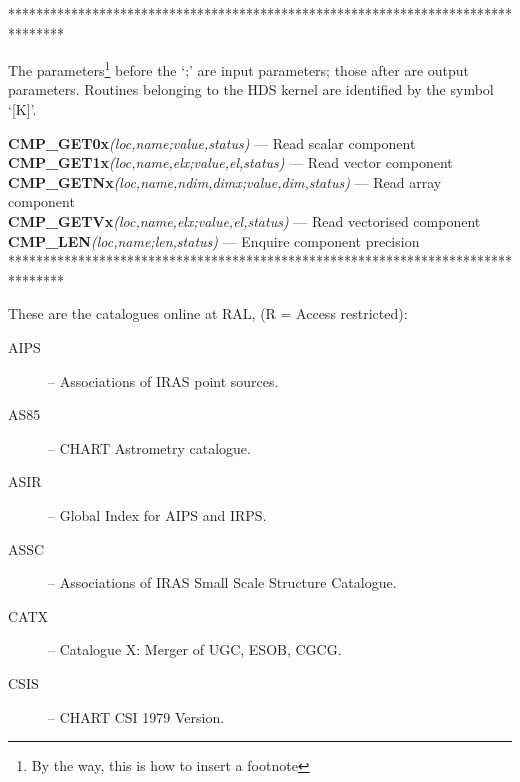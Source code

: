 ********************************************************************************

The parameters\footnote{By the way, this is how to insert a footnote} before
the `;' are input parameters; those after are output parameters.
Routines belonging to the HDS kernel are identified by the symbol `[K]'.

\noindent
{\bf CMP\_GET0x}{\em (loc,name;value,status)} --- Read scalar component\\
{\bf CMP\_GET1x}{\em (loc,name,elx;value,el,status)} --- Read vector component\\
{\bf CMP\_GETNx}{\em (loc,name,ndim,dimx;value,dim,status)} --- Read array component\\
{\bf CMP\_GETVx}{\em (loc,name,elx;value,el,status)} --- Read vectorised component\\
{\bf CMP\_LEN}{\em (loc,name;len,status)} --- Enquire component precision\\

********************************************************************************

These are the catalogues online at RAL, (R = Access restricted):
\begin{description}
\begin{description}
\item [AIPS] -- Associations of IRAS point sources.
\item [AS85] -- CHART Astrometry catalogue.
\item [ASIR] -- Global Index for AIPS and IRPS.
\item [ASSC] -- Associations of IRAS Small Scale Structure Catalogue.
\item [CATX] -- Catalogue X: Merger of UGC, ESOB, CGCG.
\item [CSIS] -- CHART CSI 1979 Version.
\end{description}
\end{description}

\newpage

